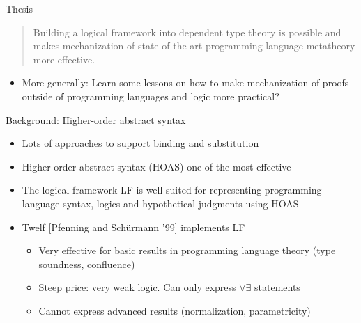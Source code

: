 \documentclass[usenames,dvipsnames]{beamer}
\begin{document}
\begin{frame}{Thesis}
\begin{quote}Building a logical framework into dependent type
theory is possible and makes mechanization of state-of-the-art programming
language metatheory more effective.
\end{quote}
\begin{itemize}
\pause
\item More generally: Learn some lessons on how
to make mechanization of proofs outside of programming languages and
logic more practical?
\end{itemize}
\end{frame}

\begin{frame}{Background: Higher-order abstract syntax}
\begin{itemize}
\item Lots of approaches to support binding and substitution
\item Higher-order abstract syntax (HOAS) one of the most effective
\item The logical framework LF is well-suited for representing
programming language syntax, logics and hypothetical
judgments using HOAS
\item Twelf [Pfenning and Sch\"urmann '99] implements LF
\begin{itemize}
\item Very effective for basic results in programming language theory (type soundness, confluence)
\item Steep price: very weak logic. Can only express $\forall\exists$ statements
\item Cannot express advanced results (normalization, parametricity)
\end{itemize}
\end{itemize}
\end{frame}
\end{document}
